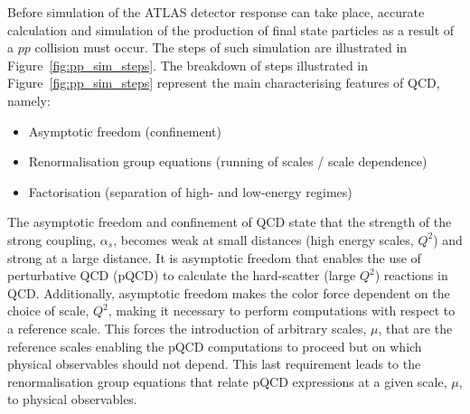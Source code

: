 Before simulation of the ATLAS detector response can take place, accurate calculation and simulation of the production of final
state particles as a result of a $pp$ collision must occur.
The steps of such simulation are illustrated in Figure~\ref{fig:pp_sim_steps}.
The breakdown of steps illustrated in Figure~\ref{fig:pp_sim_steps} represent the main characterising features
of QCD, namely: 
\begin{itemize}
    \item Asymptotic freedom (confinement)
    \item Renormalisation group equations (running of scales / scale dependence)
    \item Factorisation (separation of high- and low-energy regimes)
\end{itemize}

The asymptotic freedom and confinement of QCD state that the strength of the strong coupling, $\alpha_s$, becomes weak at
small distances (high energy scales, $Q^2$) and strong at a large distance.
It is asymptotic freedom that enables the use of perturbative QCD (pQCD) to calculate the hard-scatter (large $Q^2$)
reactions in QCD. Additionally, asymptotic freedom makes the color force dependent on the choice of scale, $Q^2$,
making it necessary to perform computations with respect to a reference scale.
This forces the introduction of arbitrary scales, $\mu$, that are the reference scales enabling the pQCD computations
to proceed but on which physical observables should not depend.
This last requirement leads to the renormalisation group equations that relate pQCD expressions at a given
scale, $\mu$, to physical observables.

